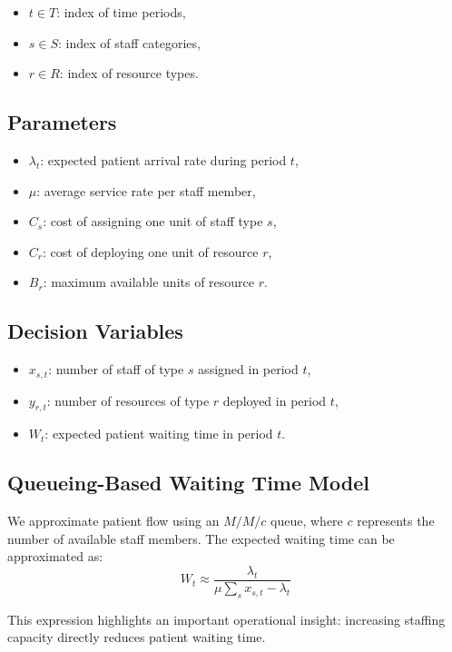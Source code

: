 \documentclass[12pt,a4paper]{article}
\begin{document}
	\begin{itemize}
		\item $t \in T$: index of time periods,
		\item $s \in S$: index of staff categories,
		\item $r \in R$: index of resource types.
	\end{itemize}
	
	\subsection{Parameters}
	
	\begin{itemize}
		\item $\lambda_t$: expected patient arrival rate during period $t$,
		\item $\mu$: average service rate per staff member,
		\item $C_s$: cost of assigning one unit of staff type $s$,
		\item $C_r$: cost of deploying one unit of resource $r$,
		\item $B_r$: maximum available units of resource $r$.
	\end{itemize}
	
	\subsection{Decision Variables}
	
	\begin{itemize}
		\item $x_{s,t}$: number of staff of type $s$ assigned in period $t$,
		\item $y_{r,t}$: number of resources of type $r$ deployed in period $t$,
		\item $W_t$: expected patient waiting time in period $t$.
	\end{itemize}
	
	\subsection{Queueing-Based Waiting Time Model}
	
	We approximate patient flow using an $M/M/c$ queue, where $c$ represents the number of available staff members. The expected waiting time can be approximated as:
	\[
	W_t \approx \frac{\lambda_t}{\mu \sum_{s} x_{s,t} - \lambda_t}
	\]
	
	This expression highlights an important operational insight: increasing staffing capacity directly reduces patient waiting time.
	
\end{document}
